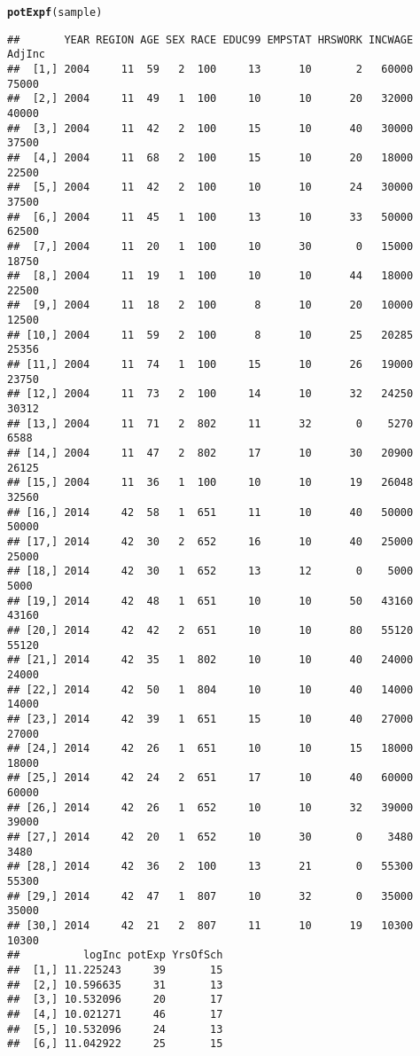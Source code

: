 \documentclass{article}\usepackage[]{graphicx}\usepackage[]{color}
\makeatletter
\newcommand{\hlstd}[1]{\textcolor[rgb]{0.345,0.345,0.345}{#1}}%
\newcommand{\hlkwd}[1]{\textcolor[rgb]{0.737,0.353,0.396}{\textbf{#1}}}%
\newenvironment{kframe}{%
 \def\at@end@of@kframe{}%
 \ifinner\ifhmode%
  \def\at@end@of@kframe{\end{minipage}}%
  \begin{minipage}{\columnwidth}%
 \fi\fi%
 \def\FrameCommand##1{\hskip\@totalleftmargin \hskip-\fboxsep
 \colorbox{shadecolor}{##1}\hskip-\fboxsep
     \hskip-\linewidth \hskip-\@totalleftmargin \hskip\columnwidth}%
 \MakeFramed {\advance\hsize-\width
   \@totalleftmargin\z@ \linewidth\hsize
   \@setminipage}}%
 {\par\unskip\endMakeFramed%
 \at@end@of@kframe}
\newenvironment{knitrout}{}{} %
\makeatother
\begin{document}
\begin{knitrout}
\begin{kframe}
\begin{alltt}
\hlkwd{potExpf}\hlstd{(sample)}
\end{alltt}
\begin{verbatim}
##       YEAR REGION AGE SEX RACE EDUC99 EMPSTAT HRSWORK INCWAGE AdjInc
##  [1,] 2004     11  59   2  100     13      10       2   60000  75000
##  [2,] 2004     11  49   1  100     10      10      20   32000  40000
##  [3,] 2004     11  42   2  100     15      10      40   30000  37500
##  [4,] 2004     11  68   2  100     15      10      20   18000  22500
##  [5,] 2004     11  42   2  100     10      10      24   30000  37500
##  [6,] 2004     11  45   1  100     13      10      33   50000  62500
##  [7,] 2004     11  20   1  100     10      30       0   15000  18750
##  [8,] 2004     11  19   1  100     10      10      44   18000  22500
##  [9,] 2004     11  18   2  100      8      10      20   10000  12500
## [10,] 2004     11  59   2  100      8      10      25   20285  25356
## [11,] 2004     11  74   1  100     15      10      26   19000  23750
## [12,] 2004     11  73   2  100     14      10      32   24250  30312
## [13,] 2004     11  71   2  802     11      32       0    5270   6588
## [14,] 2004     11  47   2  802     17      10      30   20900  26125
## [15,] 2004     11  36   1  100     10      10      19   26048  32560
## [16,] 2014     42  58   1  651     11      10      40   50000  50000
## [17,] 2014     42  30   2  652     16      10      40   25000  25000
## [18,] 2014     42  30   1  652     13      12       0    5000   5000
## [19,] 2014     42  48   1  651     10      10      50   43160  43160
## [20,] 2014     42  42   2  651     10      10      80   55120  55120
## [21,] 2014     42  35   1  802     10      10      40   24000  24000
## [22,] 2014     42  50   1  804     10      10      40   14000  14000
## [23,] 2014     42  39   1  651     15      10      40   27000  27000
## [24,] 2014     42  26   1  651     10      10      15   18000  18000
## [25,] 2014     42  24   2  651     17      10      40   60000  60000
## [26,] 2014     42  26   1  652     10      10      32   39000  39000
## [27,] 2014     42  20   1  652     10      30       0    3480   3480
## [28,] 2014     42  36   2  100     13      21       0   55300  55300
## [29,] 2014     42  47   1  807     10      32       0   35000  35000
## [30,] 2014     42  21   2  807     11      10      19   10300  10300
##          logInc potExp YrsOfSch
##  [1,] 11.225243     39       15
##  [2,] 10.596635     31       13
##  [3,] 10.532096     20       17
##  [4,] 10.021271     46       17
##  [5,] 10.532096     24       13
##  [6,] 11.042922     25       15

\end{verbatim}
\end{kframe}
\end{knitrout}
\end{document}

